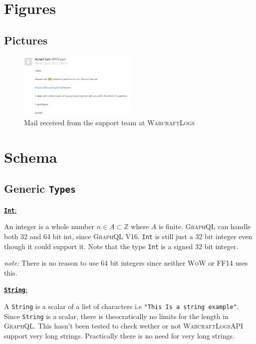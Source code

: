 \documentclass[10pt, a4paper]{memoir}
\numberwithin{equation}{section}
\theoremstyle{plain}
\theoremstyle{defp}
\theoremstyle{dotless}
\theoremstyle{definition}
\theoremstyle{dotless}
\theoremstyle{dotless}
\theoremstyle{defp}
\theoremstyle{defp}
\theoremstyle{be}          %
\theoremstyle{defp}
\newcommand\mb[1]{\mathbb{#1}}
\newcommand\ttt[1]{\texttt{#1}}
\newcommand\tsc[1]{\textsc{#1}}
\begin{document}
\newpage

\appendix
\chapter{Figures}

\section{Pictures}

\begin{figure}[h]
\centering
\includegraphics[width=0.5\textwidth]{mail1.PNG}
\caption{Mail received from the support team at \textsc{WarcraftLogs}}
\label{fig:MailSupp}
\end{figure}


\chapter{Schema}

\section{Generic \ttt{Types}}

\underline{\textbf{\ttt{Int}}:}

An integer is a whole number $n\in A\subset\mb{Z}$ where $A$ is finite. \textsc{GraphQL} can handle both 32 and 64 bit int, since \tsc{GraphQL V16}. \ttt{Int} is still just a 32 bit integer even though it could support it. Note that the type \ttt{Int} is a signed 32 bit integer.

\medskip

\textit{note:} There is no reason to use 64 bit integers since neither \tsc{WoW} or \tsc{FF14} uses this.

\medskip

\underline{\textbf{\ttt{String}}:}

A \ttt{String} is a scalar of a list of characters i.e \ttt{"This Is a string example"}. Since \ttt{String} is a scalar, there is theocratically no limits for the length in \tsc{GraphQL}. This hasn't been tested to check wether or not \tsc{WarcraftLogsAPI} support very long strings. Practically there is no need for very long strings.
\end{document}
